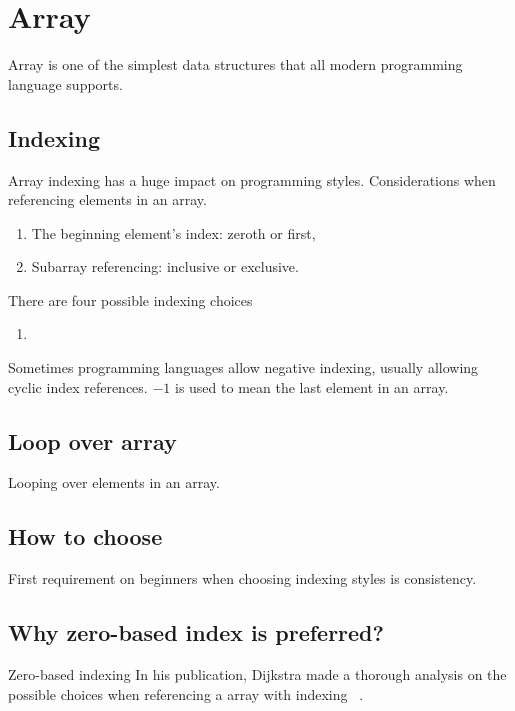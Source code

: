 
\section{Array}\label{sec:array-pattern}

Array is one of the simplest data structures that all modern programming language supports.

\subsection{Indexing}\label{subsec:indexing}

Array indexing has a huge impact on programming styles.
Considerations when referencing elements in an array.
\begin{enumerate}
    \item The beginning element's index: zeroth or first,
    \item Subarray referencing: inclusive or exclusive.
\end{enumerate}
There are four possible indexing choices
\begin{enumerate}
    \item
\end{enumerate}

Sometimes programming languages allow negative indexing, usually allowing cyclic index
references.
$-1$ is used to mean the last element in an array.

\subsection{Loop over array}

Looping over elements in an array.

\subsection{How to choose}\label{subsec:howToChoose}

First requirement on beginners when choosing indexing styles is consistency.

\subsection{Why zero-based index is preferred?}

Zero-based indexing In his publication, Dijkstra made a thorough analysis on the possible choices
when referencing a
array with indexing ~\cite{Dijkstra-2008}.


